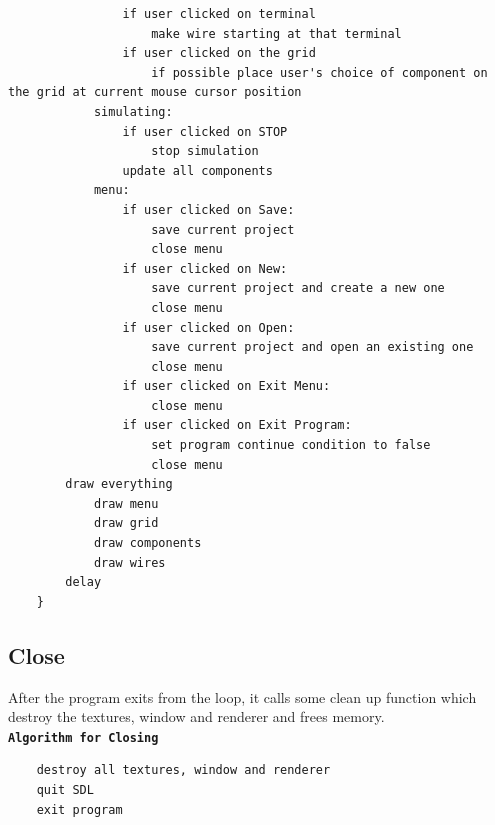 \documentclass[report.tex]{subfiles}
\begin{document}
\begin{verbatim}
                if user clicked on terminal
                    make wire starting at that terminal
                if user clicked on the grid
                    if possible place user's choice of component on the grid at current mouse cursor position
            simulating:
                if user clicked on STOP
                    stop simulation
                update all components
            menu:
                if user clicked on Save:
                    save current project
                    close menu
                if user clicked on New:
                    save current project and create a new one
                    close menu
                if user clicked on Open:
                    save current project and open an existing one
                    close menu
                if user clicked on Exit Menu:
                    close menu
                if user clicked on Exit Program:
                    set program continue condition to false 
                    close menu
        draw everything
            draw menu
            draw grid
            draw components
            draw wires
        delay
    }
        \end{verbatim}
    \subsection{Close}
    After the program exits from the loop, it calls some clean up function which destroy the textures, window and renderer and frees memory.\\
        \textbf{\texttt{Algorithm for Closing}}
        \begin{verbatim}
    destroy all textures, window and renderer
    quit SDL
    exit program
        \end{verbatim}
\end{document}
